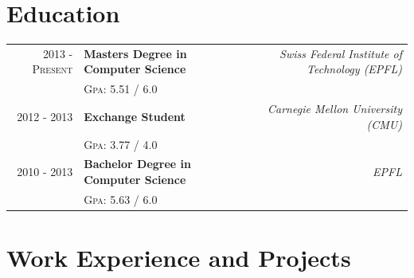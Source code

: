 \documentclass[a4paper,11pt]{article} %
\begin{document}
\section{Education}

\begin{tabularx}{\textwidth}{r X r} 	
2013 - \textsc{Present} & 
\textbf{Masters Degree in Computer Science} & 
\textit{Swiss Federal Institute of Technology (EPFL)}\\
&\footnotesize \textsc{Gpa}: 5.51 / 6.0\\


2012 - 2013 & 
\textbf{Exchange Student} &
\textit{Carnegie Mellon University (CMU)}\\
&\footnotesize \textsc{Gpa}: 3.77 / 4.0\\


2010 - 2013 & 
\textbf{Bachelor Degree in Computer Science} & 
\textit{ EPFL }\\
&\footnotesize \textsc{Gpa}: 5.63 / 6.0\\


\end{tabularx}


\section{Work Experience and Projects}
\end{document}
